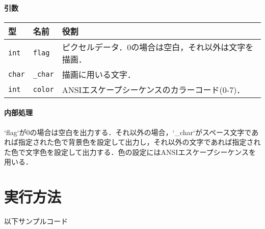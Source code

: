 \documentclass[uplatex]{jsarticle}
\begin{document}
\paragraph{引数}
\begin{center}
    \begin{tabular}{|l|l|p{7cm}|}
        \hline
        \textbf{型} & \textbf{名前} & \textbf{役割} \\ \hline
        \texttt{int} & \texttt{flag} & ピクセルデータ．0の場合は空白，それ以外は文字を描画． \\ \hline
        \texttt{char} & \texttt{\_char} & 描画に用いる文字． \\ \hline
        \texttt{int} & \texttt{color} & ANSIエスケープシーケンスのカラーコード(0-7)． \\ \hline
    \end{tabular}
\end{center}

\paragraph{内部処理}
`flag`が0の場合は空白を出力する．それ以外の場合，`\_char`がスペース文字であれば指定された色で背景色を設定して出力し，それ以外の文字であれば指定された色で文字色を設定して出力する．色の設定にはANSIエスケープシーケンスを用いる．

\section{実行方法}
以下サンプルコード
\end{document}
